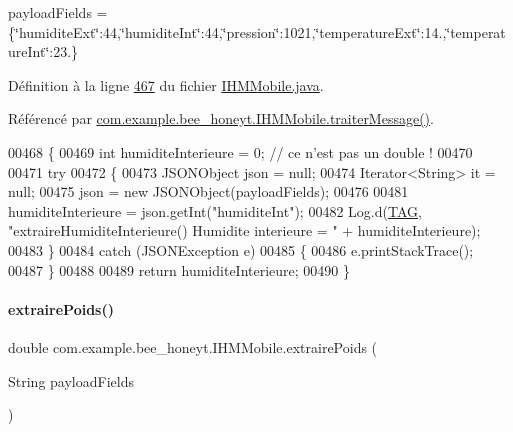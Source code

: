 payload\+Fields = \{\char`\"{}humidite\+Ext\char`\"{}\+:44,\char`\"{}humidite\+Int\char`\"{}\+:44,\char`\"{}pression\char`\"{}\+:1021,\char`\"{}temperature\+Ext\char`\"{}\+:14.,\char`\"{}temperature\+Int\char`\"{}\+:23.\}

Définition à la ligne \hyperlink{_i_h_m_mobile_8java_source_l00467}{467} du fichier \hyperlink{_i_h_m_mobile_8java_source}{I\+H\+M\+Mobile.\+java}.



Référencé par \hyperlink{_i_h_m_mobile_8java_source_l00374}{com.\+example.\+bee\+\_\+honeyt.\+I\+H\+M\+Mobile.\+traiter\+Message()}.


\begin{DoxyCode}
00468     \{
00469         \textcolor{keywordtype}{int} humiditeInterieure = 0; \textcolor{comment}{// ce n'est pas un double !}
00470 
00471         \textcolor{keywordflow}{try}
00472         \{
00473             JSONObject json = null;
00474             Iterator<String> it = null;
00475             json = \textcolor{keyword}{new} JSONObject(payloadFields);
00476 
00481             humiditeInterieure = json.getInt(\textcolor{stringliteral}{"humiditeInt"});
00482             Log.d(\hyperlink{classcom_1_1example_1_1bee__honeyt_1_1_i_h_m_mobile_a366987bf9bb2ed1010b2f967d4efa263}{TAG}, \textcolor{stringliteral}{"extraireHumiditeInterieure() Humidite interieure = "} + humiditeInterieure);
00483         \}
00484         \textcolor{keywordflow}{catch} (JSONException e)
00485         \{
00486             e.printStackTrace();
00487         \}
00488 
00489         \textcolor{keywordflow}{return} humiditeInterieure;
00490     \}
\end{DoxyCode}
\mbox{\label{classcom_1_1example_1_1bee__honeyt_1_1_i_h_m_mobile_ad702e818ba1d861f26accfd6a0194b86}} 
\paragraph{\texorpdfstring{extraire\+Poids()}{extrairePoids()}}
{\footnotesize\ttfamily double com.\+example.\+bee\+\_\+honeyt.\+I\+H\+M\+Mobile.\+extraire\+Poids (\begin{DoxyParamCaption}\item[{String}]{payload\+Fields }\end{DoxyParamCaption})\hspace{0.3cm}{\ttfamily [private]}}



